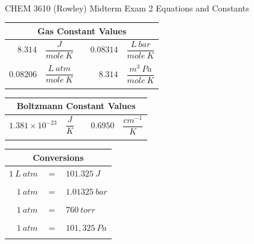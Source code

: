 \documentclass[12pt, letterpaper]{memoir}
\begin{document}
\newpage
\pagestyle{empty}

~
\vspace{-3em}
\begin{center}
	{\LARGE CHEM 3610 (Rowley) Midterm Exam 2 Equations and Constants}
\end{center}

\vspace{-1em}\noindent
\begin{minipage}{0.57\linewidth}
	\begin{mdframed}
		\begin{tabular}{rlcrl}
			\multicolumn{5}{c}{Gas Constant Values}                                       \\ \midrule
			$8.314$   & $\dfrac{J}{mole~K}$     &  & $0.08314$ & $\dfrac{L~bar}{mole~K}$  \\ \\
			$0.08206$ & $\dfrac{L~atm}{mole~K}$ &  & $8.314$   & $\dfrac{m^3~Pa}{mole~K}$ \\ \\
		\end{tabular}
		\begin{tabular}{rlcrl}
			\multicolumn{5}{c}{Boltzmann Constant Values}                                 \\ \midrule
			$1.381 \times 10^{-23}$ & $\dfrac{J}{K}$ &  & $0.6950$ & $\dfrac{cm^{-1}}{K}$ \\ \\
		\end{tabular}
	\end{mdframed}
\end{minipage}
\hspace{20pt}
\begin{minipage}{0.4\linewidth}
	\begin{mdframed}
		\begin{tabular}{rcl}
			\multicolumn{3}{c}{Conversions}  \\ \midrule
			$1~L~atm $ & $=$ & $101.325~J$   \\ \\
			$1~atm $   & $=$ & $1.01325~bar$ \\ \\
			$1~atm $   & $=$ & $760~torr$    \\ \\
			$1~atm $   & $=$ & $101,325~Pa$  \\ \\
		\end{tabular}
	\end{mdframed}
\end{minipage}
\end{document}
